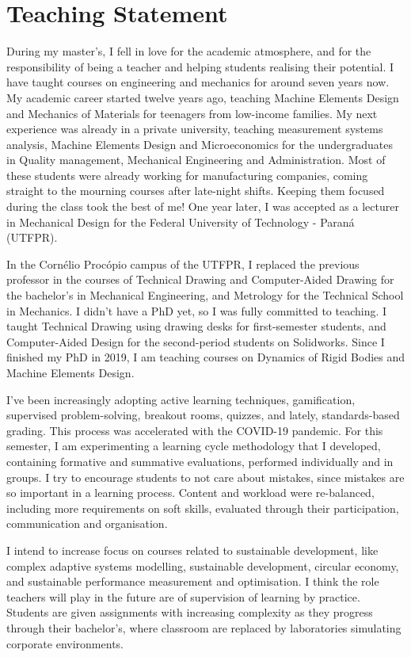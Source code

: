 
\section*{Teaching Statement} 
\vspace{-8pt}

During my master's, I fell in love for the academic atmosphere, and for the responsibility of being a teacher and helping students realising their potential. I have taught courses on engineering and mechanics for around seven years now. My academic career started twelve years ago, teaching Machine Elements Design and Mechanics of Materials for teenagers from low-income families. My next experience was already in a private university, teaching measurement systems analysis, Machine Elements Design and Microeconomics for the undergraduates in Quality management, Mechanical Engineering and Administration. Most of these students were already working for manufacturing companies, coming straight to the mourning courses after late-night shifts. Keeping them focused during the class took the best of me! One year later, I was accepted as a lecturer in Mechanical Design for the Federal University of Technology - Paraná (UTFPR). 

In the Cornélio Procópio campus of the UTFPR, I replaced the previous professor in the courses of Technical Drawing and Computer-Aided Drawing for the bachelor's in Mechanical Engineering, and Metrology for the Technical School in Mechanics. I didn't have a PhD yet, so I was fully committed to teaching. I taught Technical Drawing using drawing desks for first-semester students, and Computer-Aided Design for the second-period students on Solidworks. Since I finished my PhD in 2019, I am teaching courses on Dynamics of Rigid Bodies and Machine Elements Design. 

I've been increasingly adopting active learning techniques, gamification, supervised problem-solving, breakout rooms, quizzes, and lately, standards-based grading. This process was accelerated with the COVID-19 pandemic. For this semester, I am experimenting a learning cycle methodology that I developed, containing formative and summative evaluations, performed individually and in groups. I try to encourage students to not care about mistakes, since mistakes are so important in a learning process. Content and workload were re-balanced, including more requirements on soft skills, evaluated through their participation, communication and organisation. 

I intend to increase focus on courses related to sustainable development, like complex adaptive systems modelling, sustainable development, circular economy, and sustainable performance measurement and optimisation. I think the role teachers will play in the future are of supervision of learning by practice. Students are given assignments with increasing complexity as they progress through their bachelor's, where classroom are replaced by laboratories simulating corporate environments. 